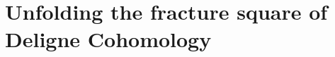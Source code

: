\documentclass[10pt]{amsart}
\theoremstyle{definition}
\theoremstyle{remark}
\numberwithin{equation}{section}
\begin{document}



\section{Unfolding the fracture square of Deligne Cohomology}

{\footnotesize


}
\end{document}
